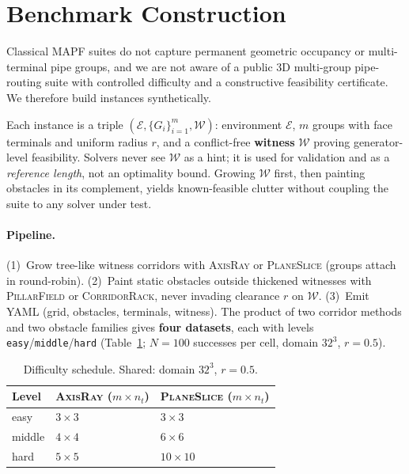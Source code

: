 
\section{Benchmark Construction}
\label{sec:benchmark}

Classical MAPF suites do not capture permanent geometric occupancy or
multi-terminal pipe groups, and we are not aware of a public 3D multi-group
pipe-routing suite with controlled difficulty and a constructive feasibility
certificate. We therefore build instances synthetically.

Each instance is a triple $(\mathcal{E},\{G_i\}_{i=1}^{m},\mathcal{W})$:
environment $\mathcal{E}$, $m$ groups with face terminals and uniform radius
$r$, and a conflict-free \textbf{witness} $\mathcal{W}$ proving generator-level
feasibility. Solvers never see $\mathcal{W}$ as a hint; it is used for
validation and as a \emph{reference length}, not an optimality bound.
Growing $\mathcal{W}$ first, then painting obstacles in its complement, yields
known-feasible clutter without coupling the suite to any solver under test.

\paragraph{Pipeline.}
(1)~Grow tree-like witness corridors with \textsc{AxisRay} or
\textsc{PlaneSlice} (groups attach in round-robin).
(2)~Paint static obstacles outside thickened witnesses with
\textsc{PillarField} or \textsc{CorridorRack}, never invading clearance $r$ on
$\mathcal{W}$.
(3)~Emit YAML (grid, obstacles, terminals, witness).
The product of two corridor methods and two obstacle families gives
\textbf{four datasets}, each with levels
\texttt{easy}/\texttt{middle}/\texttt{hard}
(Table~\ref{tab:difficulty}; $N{=}100$ successes per cell, domain $32^3$,
$r{=}0.5$).

\begin{table}[t]
  \centering
  \caption{Difficulty schedule. Shared: domain $32^3$, $r{=}0.5$.}
  \label{tab:difficulty}
  \begin{tabular}{@{}lll@{}}
    \toprule
    Level & \textsc{AxisRay} ($m \times n_t$) & \textsc{PlaneSlice} ($m \times n_t$) \\
    \midrule
    easy   & $3\times 3$ & $3\times 3$ \\
    middle & $4\times 4$ & $6\times 6$ \\
    hard   & $5\times 5$ & $10\times 10$ \\
    \bottomrule
  \end{tabular}
\end{table}

